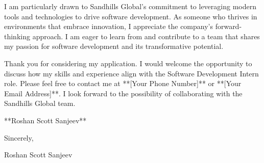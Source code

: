 \documentclass[letterpaper,11pt]{article}
\begin{document}
I am particularly drawn to Sandhills Global's commitment to leveraging modern tools and technologies to drive software development. As someone who thrives in environments that embrace innovation, I appreciate the company's forward-thinking approach. I am eager to learn from and contribute to a team that shares my passion for software development and its transformative potential.

Thank you for considering my application. I would welcome the opportunity to discuss how my skills and experience align with the Software Development Intern role. Please feel free to contact me at **[Your Phone Number]** or **[Your Email Address]**. I look forward to the possibility of collaborating with the Sandhills Global team.

**Roshan Scott Sanjeev**


\vspace{0.25in}

Sincerely,

\vspace{0.5in}

Roshan Scott Sanjeev
\end{document}
